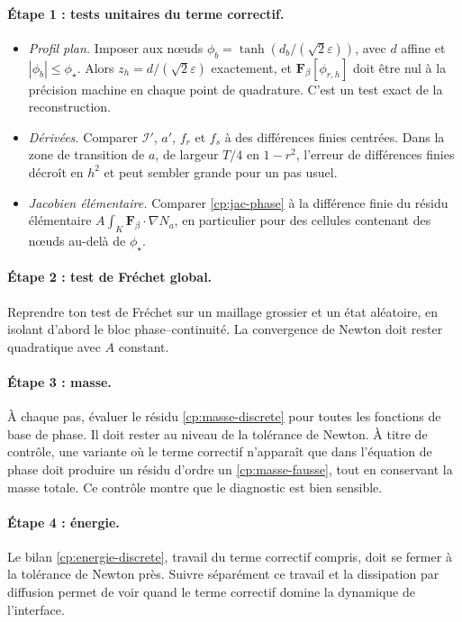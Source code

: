 \paragraph{Étape 1 : tests unitaires du terme correctif.}
\begin{itemize}
  \item \emph{Profil plan.} Imposer aux nœuds $\phi_b = \tanh\!\left(d_b/(\sqrt{2}\varepsilon)\right)$, avec $d$ affine et $|\phi_b|\le\phi_\star$. Alors $z_h = d/(\sqrt{2}\varepsilon)$ exactement, et $\mathbf{F}_\beta[\phi_{r,h}]$ doit être nul à la précision machine en chaque point de quadrature. C'est un test exact de la reconstruction.
  \item \emph{Dérivées.} Comparer $\mathcal{I}'$, $a'$, $f_r$ et $f_s$ à des différences finies centrées. Dans la zone de transition de $a$, de largeur $T/4$ en $1-r^{2}$, l'erreur de différences finies décroît en $h^{2}$ et peut sembler grande pour un pas usuel.
  \item \emph{Jacobien élémentaire.} Comparer \eqref{cp:jac-phase} à la différence finie du résidu élémentaire $A\int_K\mathbf{F}_\beta\cdot\nabla N_a$, en particulier pour des cellules contenant des nœuds au-delà de $\phi_\star$.
\end{itemize}

\paragraph{Étape 2 : test de Fréchet global.} Reprendre ton test de Fréchet sur un maillage grossier et un état aléatoire, en isolant d'abord le bloc phase--continuité. La convergence de Newton doit rester quadratique avec $A$ constant.

\paragraph{Étape 3 : masse.} À chaque pas, évaluer le résidu \eqref{cp:masse-discrete} pour toutes les fonctions de base de phase. Il doit rester au niveau de la tolérance de Newton. À titre de contrôle, une variante où le terme correctif n'apparaît que dans l'équation de phase doit produire un résidu d'ordre un \eqref{cp:masse-fausse}, tout en conservant la masse totale. Ce contrôle montre que le diagnostic est bien sensible.

\paragraph{Étape 4 : énergie.} Le bilan \eqref{cp:energie-discrete}, travail du terme correctif compris, doit se fermer à la tolérance de Newton près. Suivre séparément ce travail et la dissipation par diffusion permet de voir quand le terme correctif domine la dynamique de l'interface.

